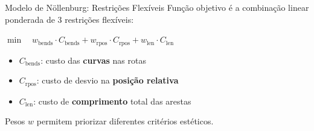 \documentclass{beamer}
\begin{document}


\begin{frame}{Modelo de Nöllenburg: Restrições Flexíveis}
  Função objetivo é a combinação linear ponderada de 3 restrições flexíveis:

  \vspace{0.2cm}
  \begin{block}{}
    \centering
    $\displaystyle\min \quad w_{\text{bends}} \cdot C_{\text{bends}} + w_{\text{rpos}} \cdot C_{\text{rpos}} + w_{\text{len}} \cdot C_{\text{len}}$
  \end{block}

  \vspace{0.2cm}
  \begin{itemize}
    \item $C_{\text{bends}}$: custo das \textbf{curvas} nas rotas
    \item $C_{\text{rpos}}$: custo de desvio na \textbf{posição relativa}
    \item $C_{\text{len}}$: custo de \textbf{comprimento} total das arestas
  \end{itemize}

  \vspace{0.3cm}
  \begin{exampleblock}{}
    Pesos $w$ permitem priorizar diferentes critérios estéticos.
  \end{exampleblock}
\end{frame}
\end{document}
